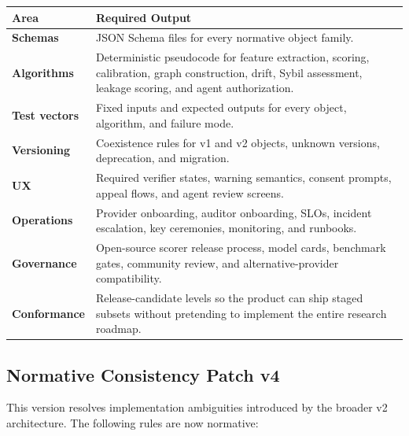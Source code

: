 \documentclass[11pt]{article}
\begin{document}
\begin{center}
\begin{tabularx}{\textwidth}{>{\bfseries}p{} X}
\toprule
Area & Required Output \\
\midrule
Schemas & JSON Schema files for every normative object family. \\
Algorithms & Deterministic pseudocode for feature extraction, scoring, calibration, graph construction, drift, Sybil assessment, leakage scoring, and agent authorization. \\
Test vectors & Fixed inputs and expected outputs for every object, algorithm, and failure mode. \\
Versioning & Coexistence rules for v1 and v2 objects, unknown versions, deprecation, and migration. \\
UX & Required verifier states, warning semantics, consent prompts, appeal flows, and agent review screens. \\
Operations & Provider onboarding, auditor onboarding, SLOs, incident escalation, key ceremonies, monitoring, and runbooks. \\
Governance & Open-source scorer release process, model cards, benchmark gates, community review, and alternative-provider compatibility. \\
Conformance & Release-candidate levels so the product can ship staged subsets without pretending to implement the entire research roadmap. \\
\bottomrule
\end{tabularx}
\end{center}




\subsection{Normative Consistency Patch v4}

This version resolves implementation ambiguities introduced by the broader v2 architecture. The following rules are now normative:
\end{document}
